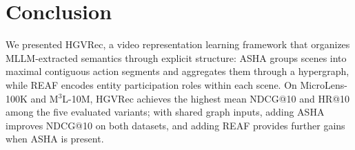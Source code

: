 \section{Conclusion}
\label{sec:conclusion}
We presented HGVRec, a video representation learning framework that organizes MLLM-extracted semantics through explicit structure: ASHA groups scenes into maximal contiguous action segments and aggregates them through a hypergraph, while REAF encodes entity participation roles within each scene.
On MicroLens-100K and M$^3$L-10M, HGVRec achieves the highest mean NDCG@10 and HR@10 among the five evaluated variants; with shared graph inputs, adding ASHA improves NDCG@10 on both datasets, and adding REAF provides further gains when ASHA is present.
